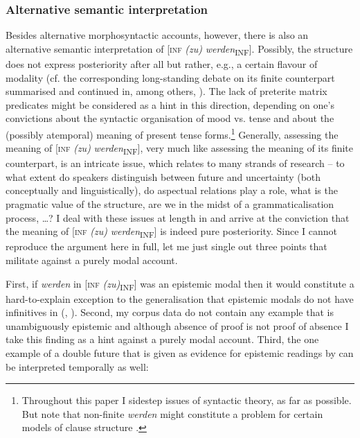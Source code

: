 \documentclass[output=paper,hidelinks]{langscibook}
\begin{document}
\subsubsection{Alternative semantic interpretation}
Besides alternative morphosyntactic accounts, however, there is also an alternative semantic interpretation of [\textsc{inf} \emph{(zu)} \textit{werden}\textsubscript{INF}]. Possibly, the structure does not express posteriority after all but rather, e.g., a certain flavour of modality (cf. the corresponding long-standing debate on its finite counterpart summarised and continued in, among others, \citealt{Hacke2009}). The lack of preterite matrix predicates might be considered as a hint in this direction, depending on one’s convictions about the syntactic organisation of mood vs. tense and about the (possibly atemporal) meaning of present tense forms.\footnote{Throughout this paper I sidestep issues of syntactic theory, as far as possible. But note that non-finite \emph{werden} might constitute a problem for certain models of clause structure \citep{Erb2001}.} Generally, assessing the meaning of [\textsc{inf} \emph{(zu)} \textit{werden}\textsubscript{INF}], very much like assessing the meaning of its finite counterpart, is an intricate issue, which relates to many strands of research – to what extent do speakers distinguish between future and uncertainty (both conceptually and linguistically), do aspectual relations play a role, what is the pragmatic value of the structure, are we in the midst of a grammaticalisation process, …? I deal with these issues at length in \citet{Reiner2018} and arrive at the conviction that the meaning of [\textsc{inf} \emph{(zu)} \textit{werden}\textsubscript{INF}] is indeed pure posteriority. Since I cannot reproduce the argument here in full, let me just single out three points that militate against a purely modal account.

First, if \emph{werden} in [\textsc{inf} \textit{(zu)}\textsubscript{INF}] was an epistemic modal then it would constitute a hard-to-explain exception to the generalisation that epistemic modals do not have infinitives in  (\citealt{Abraham2001},  \citealt[118–119]{Kiss2005}). Second, my corpus data do not contain any example that is unambiguously epistemic and although absence of proof is not proof of absence I take this finding as a hint against a purely modal account. Third, the one example of a double future that is given as evidence for epistemic readings by \citet[115]{Rothstein2013a} can be interpreted temporally as well:\largerpage[-1]
\end{document}
